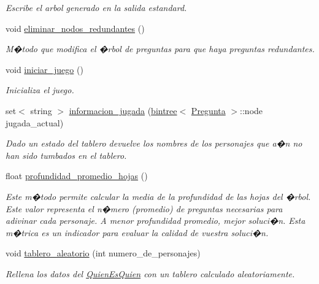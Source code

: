 \begin{DoxyCompactItemize}
\begin{DoxyCompactList}\small\item\em Escribe el arbol generado en la salida estandard. \end{DoxyCompactList}\item 
void \hyperlink{classQuienEsQuien_a010586f119ad0966d35c64382a64e3bc}{eliminar\+\_\+nodos\+\_\+redundantes} ()
\begin{DoxyCompactList}\small\item\em M�todo que modifica el �rbol de preguntas para que haya preguntas redundantes. \end{DoxyCompactList}\item 
void \hyperlink{classQuienEsQuien_a381bcd553e7c0231bb1f33e67ae3c653}{iniciar\+\_\+juego} ()
\begin{DoxyCompactList}\small\item\em Inicializa el juego. \end{DoxyCompactList}\item 
set$<$ string $>$ \hyperlink{classQuienEsQuien_a16816dd39d95ad489e44469f89fabbd4}{informacion\+\_\+jugada} (\hyperlink{classbintree}{bintree}$<$ \hyperlink{classPregunta}{Pregunta} $>$\+::node jugada\+\_\+actual)
\begin{DoxyCompactList}\small\item\em Dado un estado del tablero devuelve los nombres de los personajes que a�n no han sido tumbados en el tablero. \end{DoxyCompactList}\item 
float \hyperlink{classQuienEsQuien_ae999ad6c20f9ebf6a710060b99741126}{profundidad\+\_\+promedio\+\_\+hojas} ()
\begin{DoxyCompactList}\small\item\em Este m�todo permite calcular la media de la profundidad de las hojas del �rbol. Este valor representa el n�mero (promedio) de preguntas necesarias para adivinar cada personaje. A menor profundidad promedio, mejor soluci�n. Esta m�trica es un indicador para evaluar la calidad de vuestra soluci�n. \end{DoxyCompactList}\item 
void \hyperlink{classQuienEsQuien_ac0763b7ac0c24a3c54c2affaabe1f017}{tablero\+\_\+aleatorio} (int numero\+\_\+de\+\_\+personajes)
\begin{DoxyCompactList}\small\item\em Rellena los datos del \hyperlink{classQuienEsQuien}{Quien\+Es\+Quien} con un tablero calculado aleatoriamente. \end{DoxyCompactList}\item 

\end{DoxyCompactItemize}
